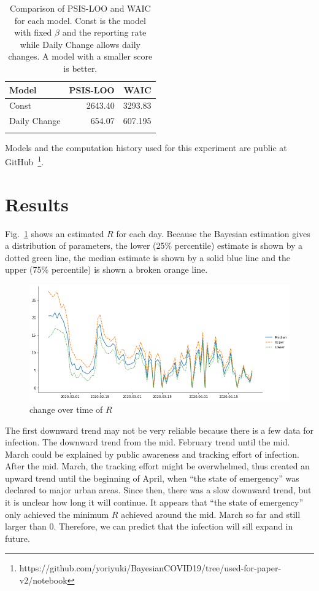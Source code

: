 \documentclass{amsart}
\begin{document}
\begin{table}[h]
\begin{center}
\begin{tabular}{lrr} \toprule
Model & PSIS-LOO & WAIC \\ \midrule 
Const & 2643.40 &  3293.83 \\ 
Daily Change & 654.07 & 607.195 \\
\bottomrule\\
\end{tabular}
\caption{Comparison of PSIS-LOO and WAIC for each model.  Const is the model with fixed $\beta$ and the reporting rate while Daily Change allows daily changes.  A model with a smaller score is better.}
\label{tbl:IC}
\end{center}
\end{table}

Models and the computation history used for this experiment are public at GitHub~\footnote{https://github.com/yoriyuki/BayesianCOVID19/tree/used-for-paper-v2/notebook}.

\section{Results}

Fig.~\ref{fig:b} shows an estimated $R$ for each day.
Because the Bayesian estimation gives a distribution of parameters, the lower (25\% percentile) estimate is shown by a dotted green line, the median estimate is shown by a solid blue line and the upper (75\% percentile) is shown a broken orange line.
\begin{figure}[h]
 \centering
 \includegraphics[width=\linewidth]{fig/R-Japan.png}
 \caption{ change over time of $R$}
 \label{fig:b}
\end{figure}
The first downward trend may not be very reliable because there is a few data for infection.
The downward trend from the mid. February trend until the mid. March could be explained by public awareness and tracking effort of infection.
After the mid. March, the tracking effort might be overwhelmed, thus created an upward trend until the beginning of April, when ``the state of emergency'' was declared to major urban areas.
Since then, there was a slow downward trend, but it is unclear how long it will continue.
It appears that ``the state of emergency'' only achieved the minimum $R$ achieved around the mid. March so far and still larger than 0.
Therefore, we can predict that the infection will sill expand in future.
\end{document}

